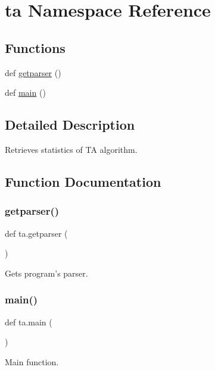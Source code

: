 \hypertarget{namespaceta}{}\section{ta Namespace Reference}
\label{namespaceta}
\subsection*{Functions}
\begin{DoxyCompactItemize}
\item 
def \hyperlink{namespaceta_ae78e80a0928a7e4870f2e601c7e04aa6}{getparser} ()
\item 
def \hyperlink{namespaceta_a55e25c8d3979081b243c8ea0d611bbc6}{main} ()
\end{DoxyCompactItemize}


\subsection{Detailed Description}
\begin{DoxyVerb}Retrieves statistics of TA algorithm.\end{DoxyVerb}
 

\subsection{Function Documentation}
\mbox{\label{namespaceta_ae78e80a0928a7e4870f2e601c7e04aa6}} 
\subsubsection{\texorpdfstring{getparser()}{getparser()}}
{\footnotesize\ttfamily def ta.\+getparser (\begin{DoxyParamCaption}{ }\end{DoxyParamCaption})}

\begin{DoxyVerb}Gets program's parser.\end{DoxyVerb}
 \mbox{\label{namespaceta_a55e25c8d3979081b243c8ea0d611bbc6}} 
\subsubsection{\texorpdfstring{main()}{main()}}
{\footnotesize\ttfamily def ta.\+main (\begin{DoxyParamCaption}{ }\end{DoxyParamCaption})}

\begin{DoxyVerb}Main function.\end{DoxyVerb}
 
